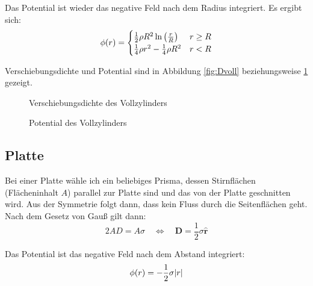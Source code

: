 \documentclass[11pt, ngerman]{article}
\newcommand{\half}{\frac 12}
\renewcommand{\vec}[1]{\boldsymbol{#1}}
\begin{document}
Das Potential ist wieder das negative Feld nach dem Radius integriert. Es ergibt sich:
\[
	\phi(r) = \begin{cases}
		\half \rho R^2 \ln\del{\frac rR} & r \geq R \\
   \frac 14 \rho r^2 - \frac 14 \rho R^2 & r < R
	\end{cases}
\]

Verschiebungsdichte und Potential sind in Abbildung \ref{fig:Dvoll} beziehungsweise \ref{fig:phivoll} gezeigt.

\begin{figure}[h]
	\centering
	\begin{minipage}[b]{0.45\textwidth}
		\centering
		\caption{Verschiebungsdichte des Vollzylinders}
		\label{fig:Dvoll}
	\end{minipage}
	\begin{minipage}[b]{0.45\textwidth}
		\centering
		\caption{Potential des Vollzylinders}
		\label{fig:phivoll}
	\end{minipage}
\end{figure}

\subsection{Platte}

Bei einer Platte wähle ich ein beliebiges Prisma, dessen Stirnflächen (Flächeninhalt $A$) parallel zur Platte sind und das von der Platte geschnitten wird. Aus der Symmetrie folgt dann, dass kein Fluss durch die Seitenflächen geht. Nach dem Gesetz von Gauß gilt dann:
\[
	2 A D = A \sigma
	\quad \Leftrightarrow \quad
	\vec D = \half \sigma \hat{\vec r}
\]

Das Potential ist das negative Feld nach dem Abstand integriert:
\[
	\phi(r) = - \half \sigma \abs r
\]
\end{document}
